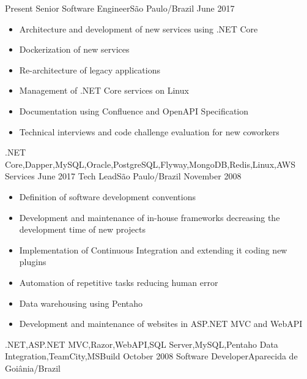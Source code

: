\begin{experiences}
  \experience
    {Present}   {Senior Software Engineer}{}{São Paulo/Brazil}
    {June 2017} {
                  \begin{itemize}
                    \item Architecture and development of new services using .NET Core
                    \item Dockerization of new services
                    \item Re-architecture of legacy applications
                    \item Management of .NET Core services on Linux
                    \item Documentation using Confluence and OpenAPI Specification
                    \item Technical interviews and code challenge evaluation for new coworkers
                  \end{itemize}
                }
                {.NET Core,Dapper,MySQL,Oracle,PostgreSQL,Flyway,MongoDB,Redis,Linux,AWS Services}
  \emptySeparator
  \experience
    {June 2017}     {Tech Lead}{}{São Paulo/Brazil}
    {November 2008} {
                      \begin{itemize}
                        \item Definition of software development conventions
                        \item Development and maintenance of in-house frameworks decreasing the development time of new projects
                        \item Implementation of Continuous Integration and extending it coding new plugins
                        \item Automation of repetitive tasks reducing human error
                        \item Data warehousing using Pentaho
                        \item Development and maintenance of websites in ASP.NET MVC and WebAPI
                      \end{itemize}
                    }
                    {.NET,ASP.NET MVC,Razor,WebAPI,SQL Server,MySQL,Pentaho Data Integration,TeamCity,MSBuild}
  \emptySeparator
  \experience
    {October 2008} {Software Developer}{}{Aparecida de Goiânia/Brazil}

\end{experiences}
